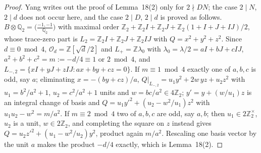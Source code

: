 \documentclass[11pt,reqno]{amsart}
\theoremstyle{plain}
\theoremstyle{definition}
\newcommand{\Q}{\mathbb{Q}}
\newcommand{\Z}{\mathbb{Z}}
\newcommand{\Lp}{L_{+}}
\begin{document}
\begin{proof}
Yang writes out the proof of Lemma~18(2) only for $2\nmid DN$; the case $2\mid N$, $2\mid d$ does
not occur here, and the case $2\mid D$, $2\mid d$ is proved as follows. $B\otimes\Q_2=
\bigl(\frac{-1,-1}{\Q_2}\bigr)$ with maximal order $\Z_2+\Z_2I+\Z_2J+\Z_2(1+I+J+IJ)/2$, whose
trace-zero part is $L_2=\Z_2I+\Z_2J+\Z_2IJ$ with $Q=x^2+y^2+z^2$. Since $d\equiv0\bmod4$,
$\mathcal O_d=\Z[\sqrt d/2]$ and $\Lp=\Z\lambda_0$ with $\lambda_0=\lambda/2=aI+bJ+cIJ$,
$a^2+b^2+c^2=m:=-d/4\equiv1$ or $2\bmod4$, and $L_{-,2}=\{xI+yJ+zIJ:ax+by+cz=0\}$. If
$m\equiv1\bmod4$ exactly one of $a,b,c$ is odd, say $a$; eliminating $x=-(by+cz)/a$,
$Q|_{L_{-,2}}=u_1y^2+2w\,yz+u_2z^2$ with $u_1=b^2/a^2+1$, $u_2=c^2/a^2+1$ units and $w=bc/a^2\in
4\Z_2$; $y'=y+(w/u_1)z$ is an integral change of basis and $Q=u_1y'^2+(u_2-w^2/u_1)z^2$ with
$u_1u_2-w^2=m/a^2$. If $m\equiv2\bmod4$ two of $a,b,c$ are odd, say $a,b$; then $u_1\in2\Z_2^\times$,
$u_2$ is a unit, $w\in2\Z_2$, and completing the square on $z$ instead gives $Q=u_2z'^2+
(u_1-w^2/u_2)y^2$, product again $m/a^2$. Rescaling one basis vector by the unit $a$ makes the
product $-d/4$ exactly, which is Lemma~18(2).
\end{proof}
\end{document}
